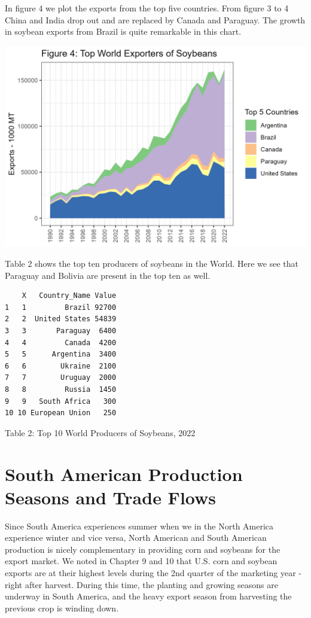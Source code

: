 \documentclass[
  letterpaper,
  DIV=11,
  numbers=noendperiod]{scrreprt}
\begin{document}
In figure 4 we plot the exports from the top five countries. From figure
3 to 4 China and India drop out and are replaced by Canada and Paraguay.
The growth in soybean exports from Brazil is quite remarkable in this
chart.

\includegraphics{assets/SouthAmericanProd_TopExporterSoy.png}

Table 2 shows the top ten producers of soybeans in the World. Here we
see that Paraguay and Bolivia are present in the top ten as well.

\begin{verbatim}
    X   Country_Name Value
1   1         Brazil 92700
2   2  United States 54839
3   3       Paraguay  6400
4   4         Canada  4200
5   5      Argentina  3400
6   6        Ukraine  2100
7   7        Uruguay  2000
8   8         Russia  1450
9   9   South Africa   300
10 10 European Union   250
\end{verbatim}

Table 2: Top 10 World Producers of Soybeans, 2022

\hypertarget{south-american-production-seasons-and-trade-flows}{%
\section{South American Production Seasons and Trade
Flows}\label{south-american-production-seasons-and-trade-flows}}

Since South America experiences summer when we in the North America
experience winter and vice versa, North American and South American
production is nicely complementary in providing corn and soybeans for
the export market. We noted in Chapter 9 and 10 that U.S. corn and
soybean exports are at their highest levels during the 2nd quarter of
the marketing year - right after harvest. During this time, the planting
and growing seasons are underway in South America, and the heavy export
season from harvesting the previous crop is winding down.
\end{document}
